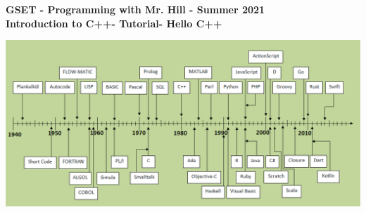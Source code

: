 \documentclass[12pt]{article}
\newcommand{\MNUM}{1} %
\newcommand{\MNAME}{Introduction to C++} %
\newcommand{\TNAME}{Hello C++} %
\begin{document}
\thispagestyle{plain}

\begin{center}
   {\bf \large GSET - Programming with Mr. Hill - Summer 2021} \vspace{5mm}\\
   {\bf \Large \MNAME \hspc -  Tutorial\hspc\MNUM\hspc - \TNAME}\vspace{3mm}\\
   
\end{center}

 \hspace*{3cm}\includegraphics[scale=.4]{TimelineOfProgrammingLanguages.png} 
\end{document}
